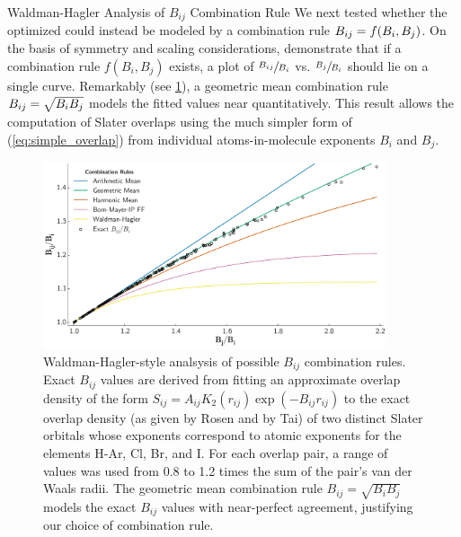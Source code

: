 \begin{section}{Waldman-Hagler Analysis of $B_{ij}$ Combination Rule}
We next tested whether the optimized \B could instead be modeled by
a combination rule $B_{ij} = f(B_i,B_j)$.  On the basis of symmetry and scaling
considerations, \citeauthor{Waldman1993} demonstrate that if a
combination rule $f(B_i,B_j)$ exists, a plot of $\sfrac{B_{ij}}{B_i}$ vs.
$\sfrac{B_j}{B_i}$ should lie on a single curve.\cite{Waldman1993} Remarkably
(see \ref{fig:bij_combination_rule}), a geometric mean combination rule $B_{ij} =
\sqrt{B_iB_j}$ models the fitted \B values near quantitatively. This
result allows the computation of Slater overlaps
using the much simpler
form of \sijapprox (\ref{eq:simple_overlap}) 
from individual atoms-in-molecule exponents $B_i$ and $B_j$.

    \begin{figure}[t]
    \includegraphics[width=0.9\textwidth]{isotropic/si/bij_combination_rule.pdf}
    \caption{
    Waldman-Hagler-style analsysis of possible $B_{ij}$ combination rules.  Exact
    $B_{ij}$ values are derived from fitting an approximate overlap density of the form $S_{ij}
    = A_{ij} K_2(r_{ij})\exp(-B_{ij}r_{ij})$ to the exact overlap density (as given by Rosen
    and by Tai\cite{Rosen1931,Tai1986}) of two distinct Slater orbitals whose exponents
    correspond to atomic exponents for the elements H-Ar, Cl, Br, and I. For each overlap pair,
    a range of \R values was used from 0.8 to 1.2 times the sum of the pair's van der Waals radii.
    The geometric mean combination rule $B_{ij} = \sqrt{B_iB_j}$ models the exact $B_{ij}$
    values with near-perfect agreement, justifying our choice of combination rule.
           		  }
    \label{fig:bij_combination_rule}        
    \end{figure}

\end{section}
